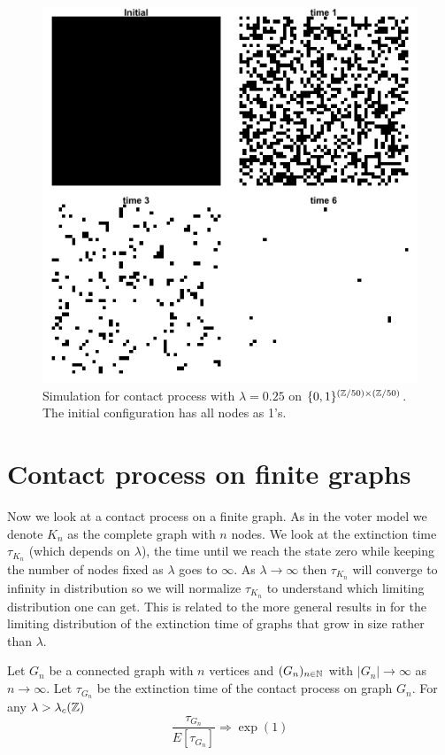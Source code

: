 \begin{figure}[H]
  \centering
    \includegraphics[width=.80\textwidth]{figures/contact_simulation_torus_25_below_crit.png}
   \caption{Simulation for contact process with $\lambda = 0.25$ on $\{0,1\}^{(\mathbb{Z}/50) \times (\mathbb{Z}/50)}$. The initial configuration has all nodes as 1's.}
  \label{fig:contact_sim_torus_below_crit.png}
\end{figure}

\section{Contact process on finite graphs}

Now we look at a contact process on a finite graph.
As in the voter model we denote $K_n$ as the complete graph with $n$ nodes.
We look at the extinction time $\tau_{K_n}$ (which depends on $\lambda$), the time until we reach the state zero while keeping the number of nodes fixed as $\lambda$ goes to $\infty$.
As $\lambda \to \infty$ then $\tau_{K_n}$ will converge to infinity in distribution so we will normalize $\tau_{K_n}$ to understand which limiting distribution one can get.
This is related to the more general results in \cite{schapira2017} for the limiting distribution of the extinction time of graphs that grow in size rather than $\lambda$.

\begin{theorem}
Let $G_n$ be a connected graph with $n$ vertices and $(G_n)_{n \in \mathbb{N}}$ with $|G_n| \to \infty$ as $n \to \infty$.
Let $\tau_{G_n}$ be the extinction time of the contact process on graph $G_n$.
For any $\lambda > \lambda_c(\mathbb{Z})$
$$
\frac{\tau_{G_n}}{E[\tau_{G_n}]} \Rightarrow \exp(1)
$$
\end{theorem}


